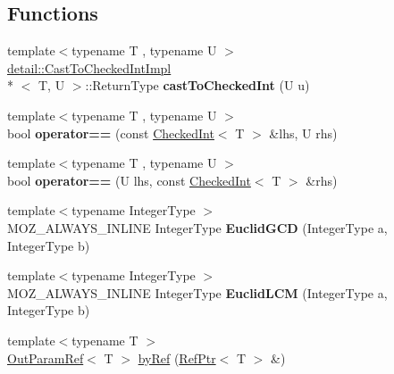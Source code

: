 \subsection*{Functions}
\begin{DoxyCompactItemize}
\item 
\hypertarget{namespacemozilla_a1e6ea5e150eb95a7eefe09fbb8c8c598}{{\footnotesize template$<$typename T , typename U $>$ }\\\hyperlink{structmozilla_1_1detail_1_1_cast_to_checked_int_impl}{detail\-::\-Cast\-To\-Checked\-Int\-Impl}\\*
$<$ T, U $>$\-::Return\-Type {\bfseries cast\-To\-Checked\-Int} (U u)}\label{namespacemozilla_a1e6ea5e150eb95a7eefe09fbb8c8c598}

\item 
\hypertarget{namespacemozilla_a3b5997be3b637fe0050a7fc8b5f56a13}{{\footnotesize template$<$typename T , typename U $>$ }\\bool {\bfseries operator==} (const \hyperlink{classmozilla_1_1_checked_int}{Checked\-Int}$<$ T $>$ \&lhs, U rhs)}\label{namespacemozilla_a3b5997be3b637fe0050a7fc8b5f56a13}

\item 
\hypertarget{namespacemozilla_ad7fb2dd361a971497a642f1689e0caf2}{{\footnotesize template$<$typename T , typename U $>$ }\\bool {\bfseries operator==} (U lhs, const \hyperlink{classmozilla_1_1_checked_int}{Checked\-Int}$<$ T $>$ \&rhs)}\label{namespacemozilla_ad7fb2dd361a971497a642f1689e0caf2}

\item 
\hypertarget{namespacemozilla_a138e186bfad4b6e7e53976a92e987b04}{{\footnotesize template$<$typename Integer\-Type $>$ }\\M\-O\-Z\-\_\-\-A\-L\-W\-A\-Y\-S\-\_\-\-I\-N\-L\-I\-N\-E Integer\-Type {\bfseries Euclid\-G\-C\-D} (Integer\-Type a, Integer\-Type b)}\label{namespacemozilla_a138e186bfad4b6e7e53976a92e987b04}

\item 
\hypertarget{namespacemozilla_a4877825eb958e89996092744b9cfe8f3}{{\footnotesize template$<$typename Integer\-Type $>$ }\\M\-O\-Z\-\_\-\-A\-L\-W\-A\-Y\-S\-\_\-\-I\-N\-L\-I\-N\-E Integer\-Type {\bfseries Euclid\-L\-C\-M} (Integer\-Type a, Integer\-Type b)}\label{namespacemozilla_a4877825eb958e89996092744b9cfe8f3}

\item 
{\footnotesize template$<$typename T $>$ }\\\hyperlink{classmozilla_1_1_out_param_ref}{Out\-Param\-Ref}$<$ T $>$ \hyperlink{namespacemozilla_aaeea387234877fbae7d87788c2b9a507}{by\-Ref} (\hyperlink{classmozilla_1_1_ref_ptr}{Ref\-Ptr}$<$ T $>$ \&)
\end{DoxyCompactItemize}


